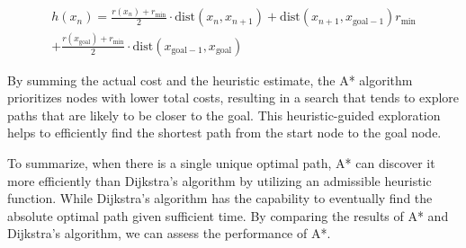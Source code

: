 \documentclass[12pt]{report}
\begin{document}
        \begin{equation}
        \begin{aligned}
        h(x_n) = \frac{r(x_n) + r_{\text{min}}}{2} \cdot \text{dist}(x_n, x_{n+1}) + \text{dist}(x_{n+1}, x_{\text{goal}-1}) r_{\text{min}} \\
        + \frac{r(x_{\text{goal}}) + r_{\text{min}}}{2} \cdot \text{dist}(x_{\text{goal}-1}, x_{\text{goal}})
        \end{aligned}
        \end{equation}

        By summing the actual cost and the heuristic estimate, the A* algorithm prioritizes nodes with lower total
        costs, resulting in a search that tends to explore paths that are likely to be closer to the goal. This
        heuristic-guided exploration helps to efficiently find the shortest path from the start node to the goal node.

        To summarize, when there is a single unique optimal path, A* can discover it more efficiently than Dijkstra's
        algorithm by utilizing an admissible heuristic function. While Dijkstra's algorithm has the capability to
        eventually find the absolute optimal path given sufficient time. By comparing the results of A* and Dijkstra's
        algorithm, we can assess the performance of A*.
\end{document}
